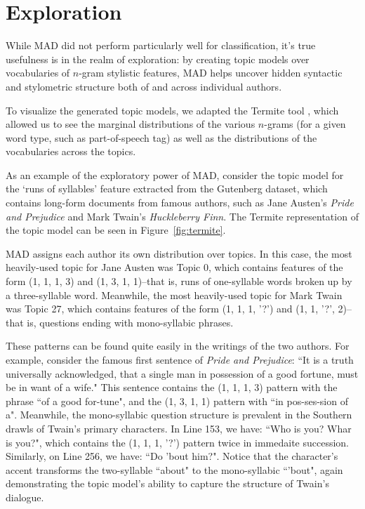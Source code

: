 \documentclass[14pt]{article} %
\theoremstyle{plain}
\theoremstyle{definition}
\theoremstyle{remark}
\begin{document}
\section{Exploration}

While MAD did not perform particularly well for classification, it's true usefulness is in the realm of exploration: by creating topic models over vocabularies of $n$-gram stylistic features, MAD helps uncover hidden syntactic and stylometric structure both of and across individual authors.

To visualize the generated topic models, we adapted the Termite tool \citep{Termite}, which allowed us to see the marginal distributions of the various $n$-grams (for a given word type, such as part-of-speech tag) as well as the distributions of the vocabularies across the topics.

As an example of the exploratory power of MAD, consider the topic model for the `runs of syllables' feature extracted from the Gutenberg dataset, which contains long-form documents from famous authors, such as Jane Austen's \textit{Pride and Prejudice} and Mark Twain's \textit{Huckleberry Finn}. The Termite representation of the topic model can be seen in Figure~\ref{fig:termite}.

MAD assigns each author its own distribution over topics. In this case, the most heavily-used topic for Jane Austen was Topic 0, which contains features of the form (1, 1, 1, 3) and (1, 3, 1, 1)--that is, runs of one-syllable words broken up by a three-syllable word. Meanwhile, the most heavily-used topic for Mark Twain was Topic 27, which contains features of the form (1, 1, 1, '?') and (1, 1, '?', 2)--that is, questions ending with mono-syllabic phrases.

These patterns can be found quite easily in the writings of the two authors. For example, consider the famous first sentence of \textit{Pride and Prejudice}: ``It is a truth universally acknowledged, that a single man in possession of a good fortune, must be in want of a wife." This sentence contains the (1, 1, 1, 3) pattern with the phrase ``of a good for-tune", and the (1, 3, 1, 1) pattern with ``in pos-ses-sion of a". Meanwhile, the mono-syllabic question structure is prevalent in the Southern drawls of Twain's primary characters. In Line 153, we have: ``Who is you? Whar is you?", which contains the (1, 1, 1, '?') pattern twice in immedaite succession. Similarly, on Line 256, we have: ``Do 'bout him?". Notice that the character's accent transforms the two-syllable ``about" to the mono-syllabic ``'bout", again demonstrating the topic model's ability to capture the structure of Twain's dialogue.
\end{document}
